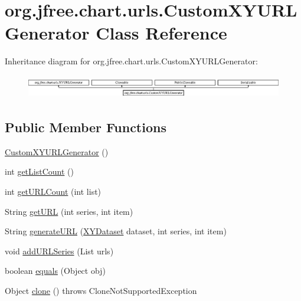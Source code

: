 \hypertarget{classorg_1_1jfree_1_1chart_1_1urls_1_1_custom_x_y_u_r_l_generator}{}\section{org.\+jfree.\+chart.\+urls.\+Custom\+X\+Y\+U\+R\+L\+Generator Class Reference}
\label{classorg_1_1jfree_1_1chart_1_1urls_1_1_custom_x_y_u_r_l_generator}
Inheritance diagram for org.\+jfree.\+chart.\+urls.\+Custom\+X\+Y\+U\+R\+L\+Generator\+:\begin{figure}[H]
\begin{center}
\leavevmode
\includegraphics[height=1.037037cm]{classorg_1_1jfree_1_1chart_1_1urls_1_1_custom_x_y_u_r_l_generator}
\end{center}
\end{figure}
\subsection*{Public Member Functions}
\begin{DoxyCompactItemize}
\item 
\mbox{\hyperlink{classorg_1_1jfree_1_1chart_1_1urls_1_1_custom_x_y_u_r_l_generator_a45dc1357f060865ca69eeff8edd6a476}{Custom\+X\+Y\+U\+R\+L\+Generator}} ()
\item 
int \mbox{\hyperlink{classorg_1_1jfree_1_1chart_1_1urls_1_1_custom_x_y_u_r_l_generator_a150aebe7283302e1f6ce22096cd47710}{get\+List\+Count}} ()
\item 
int \mbox{\hyperlink{classorg_1_1jfree_1_1chart_1_1urls_1_1_custom_x_y_u_r_l_generator_ad9f2594429e851724748d984c1e23c99}{get\+U\+R\+L\+Count}} (int list)
\item 
String \mbox{\hyperlink{classorg_1_1jfree_1_1chart_1_1urls_1_1_custom_x_y_u_r_l_generator_ada507299580dc6cb671d0b2db1b7d7df}{get\+U\+RL}} (int series, int item)
\item 
String \mbox{\hyperlink{classorg_1_1jfree_1_1chart_1_1urls_1_1_custom_x_y_u_r_l_generator_a6e3a5cfd26ca636f92ef07bdf0e5122d}{generate\+U\+RL}} (\mbox{\hyperlink{interfaceorg_1_1jfree_1_1data_1_1xy_1_1_x_y_dataset}{X\+Y\+Dataset}} dataset, int series, int item)
\item 
void \mbox{\hyperlink{classorg_1_1jfree_1_1chart_1_1urls_1_1_custom_x_y_u_r_l_generator_afd69569ecdf8a01fb8103e3996957319}{add\+U\+R\+L\+Series}} (List urls)
\item 
boolean \mbox{\hyperlink{classorg_1_1jfree_1_1chart_1_1urls_1_1_custom_x_y_u_r_l_generator_a0e8e556697e1a95db6f3a93cc31a8d53}{equals}} (Object obj)
\item 
Object \mbox{\hyperlink{classorg_1_1jfree_1_1chart_1_1urls_1_1_custom_x_y_u_r_l_generator_af8eb7d351fe6bd0534a2845ecc1fa5c7}{clone}} ()  throws Clone\+Not\+Supported\+Exception 
\end{DoxyCompactItemize}


